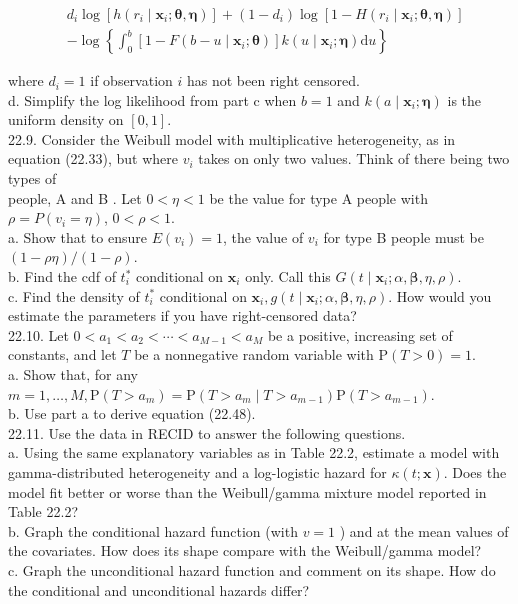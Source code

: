 \documentclass[10pt]{article}
\begin{document}
\begin{align*}
& d_{i} \log \left[h\left(r_{i} \mid \mathbf{x}_{i} ; \boldsymbol{\theta}, \boldsymbol{\eta}\right)\right]+\left(1-d_{i}\right) \log \left[1-H\left(r_{i} \mid \mathbf{x}_{i} ; \boldsymbol{\theta}, \boldsymbol{\eta}\right)\right] \\
& -\log \left\{\int_{0}^{b}\left[1-F\left(b-u \mid \mathbf{x}_{i} ; \boldsymbol{\theta}\right)\right] k\left(u \mid \mathbf{x}_{i} ; \boldsymbol{\eta}\right) \mathrm{d} u\right\} \tag{22.57}
\end{align*}


where $d_{i}=1$ if observation $i$ has not been right censored.\\
d. Simplify the log likelihood from part c when $b=1$ and $k\left(a \mid \mathbf{x}_{i} ; \boldsymbol{\eta}\right)$ is the uniform density on $[0,1]$.\\
22.9. Consider the Weibull model with multiplicative heterogeneity, as in equation (22.33), but where $v_{i}$ takes on only two values. Think of there being two types of\\
people, A and B . Let $0<\eta<1$ be the value for type A people with $\rho=P\left(v_{i}=\eta\right)$, $0<\rho<1$.\\
a. Show that to ensure $E\left(v_{i}\right)=1$, the value of $v_{i}$ for type B people must be $(1-\rho \eta) /(1-\rho)$.\\
b. Find the cdf of $t_{i}^{*}$ conditional on $\mathbf{x}_{i}$ only. Call this $G\left(t \mid \mathbf{x}_{i} ; \alpha, \boldsymbol{\beta}, \eta, \rho\right)$.\\
c. Find the density of $t_{i}^{*}$ conditional on $\mathbf{x}_{i}, g\left(t \mid \mathbf{x}_{i} ; \alpha, \boldsymbol{\beta}, \eta, \rho\right)$. How would you estimate the parameters if you have right-censored data?\\
22.10. Let $0<a_{1}<a_{2}<\cdots<a_{M-1}<a_{M}$ be a positive, increasing set of constants, and let $T$ be a nonnegative random variable with $\mathrm{P}(T>0)=1$.\\
a. Show that, for any $m=1, \ldots, M, \mathrm{P}\left(T>a_{m}\right)=\mathrm{P}\left(T>a_{m} \mid T>a_{m-1}\right) \mathrm{P}\left(T>a_{m-1}\right)$.\\
b. Use part a to derive equation (22.48).\\
22.11. Use the data in RECID to answer the following questions.\\
a. Using the same explanatory variables as in Table 22.2, estimate a model with gamma-distributed heterogeneity and a log-logistic hazard for $\kappa(t ; \mathbf{x})$. Does the model fit better or worse than the Weibull/gamma mixture model reported in Table 22.2?\\
b. Graph the conditional hazard function (with $v=1$ ) and at the mean values of the covariates. How does its shape compare with the Weibull/gamma model?\\
c. Graph the unconditional hazard function and comment on its shape. How do the conditional and unconditional hazards differ?
\end{document}
